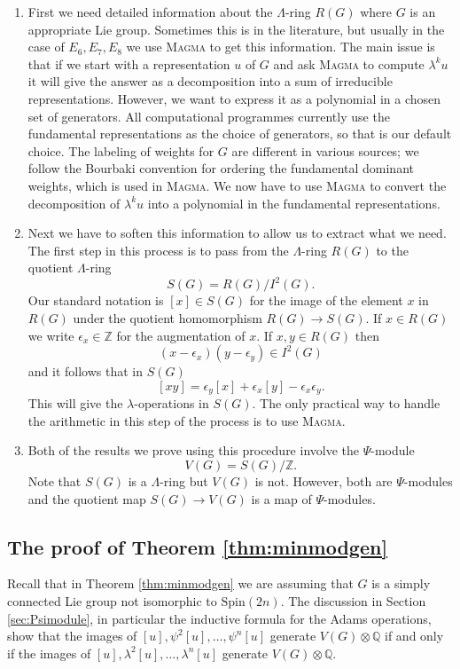 \documentclass[twoside,a4paper,reqno,11pt]{amsart}
\newcommand{\Q}{\mathbb{Q}}
\newcommand{\Z}{\mathbb{Z}}
\newcommand{\eps}{\epsilon}
\newcommand{\Spin}{\mathrm{Spin}}
\newcommand{\Magma}{\textsc{Magma}}
\begin{document}
\begin{enumerate}
\item \label{item:1}
First we need detailed information about the $\Lambda$-ring $R(G)$ where $G$ is an appropriate Lie group.  Sometimes this is in the literature, but usually in the case of $E_6, E_7, E_8$ we use \Magma{} to get this information. The main issue is that if we start with a representation $u$ of $G$ and ask \Magma{} to compute $\lambda^k u$ it will give the answer as a decomposition into a sum of irreducible representations. However, we want to express it as a polynomial in a chosen set of generators. All computational programmes currently use the fundamental representations as the choice of generators, so that is our default choice. The labeling of weights for $G$ are different in various sources; we follow the Bourbaki convention \cite[Ch.\ VI, Planches I-IX]{MR0240238} for ordering the fundamental dominant weights, which is used in \Magma{}.  We now have to use \Magma{} to convert the decomposition of $\lambda^k u$ into a polynomial in the fundamental representations.  
\item
Next we have to soften this information to allow us to extract what we need.  The first step in this process is to pass from the $\Lambda$-ring $R(G)$  to the quotient $\Lambda$-ring 
$$
S(G) = R(G)/I^2(G).
$$
Our standard notation is $[x] \in S(G)$ for the image of the element $x$ in $R(G)$ under the quotient homomorphism $R(G) \to S(G)$.  If $x \in R(G)$ we write $\eps_x \in \Z$ for the augmentation of $x$.  If $x, y \in R(G)$ then 
$$
(x - \eps_x)(y - \eps_y) \in I^2(G)
$$
and it follows that in $S(G)$
$$
[xy] = \eps_y[x] + \eps_x[y] - \eps_x\eps_y.
$$ 
This will give the $\lambda$-operations in $S(G)$.  The only practical way to handle the arithmetic in this step of the process is to use \Magma.
\item
Both of the results we prove using this procedure involve the $\Psi$-module
$$
V(G) = S(G)/\Z.
$$
Note that $S(G)$ is a $\Lambda$-ring but $V(G)$ is not. However, both are $\Psi$-modules and the quotient map $S(G) \to V(G)$ is a map of $\Psi$-modules.
\end{enumerate}

\subsection{The proof of Theorem \ref{thm:minmodgen}}

Recall that in Theorem \ref{thm:minmodgen} we are assuming that $G$ is a simply connected Lie group not isomorphic to $\Spin(2n)$. The discussion in Section \ref{sec:Psimodule}, in particular the inductive formula for the Adams operations, show that the images of $[u], \psi^2[u], \ldots, \psi^n[u]$ generate $V(G) \otimes \Q$ if and only if the images of $[u], \lambda^2[u], \ldots, \lambda^n[u]$ generate $V(G) \otimes \Q$.  
\end{document}
